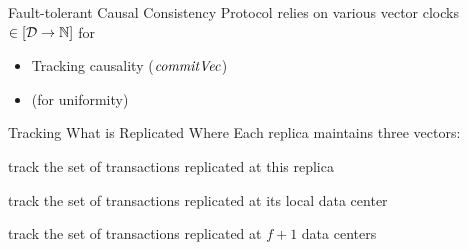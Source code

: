 
\begin{frame}{Fault-tolerant Causal Consistency Protocol}
  \unistore{} relies on various vector clocks $\in [\mathcal{D} \to \mathbb{N}]$ for \\[6pt]

  \begin{itemize}
    \setlength{\itemsep}{8pt}
    \item Tracking causality ($\mathit{commitVec}$)
    \item {} (for uniformity)
  \end{itemize}
\end{frame}




\begin{frame}{Tracking What is Replicated Where}
  Each replica maintains three vectors: \\[5pt]

  \begin{description}[<+->]
    \setlength{\itemsep}{10pt}
    \item[$\knownVC$:] track the set of transactions replicated at this replica
    \item[$\stableVC$:] track the set of transactions replicated at its local data center
    \item[$\uniformVC$:] track the set of transactions replicated at $f + 1$ data centers
  \end{description}
\end{frame}

